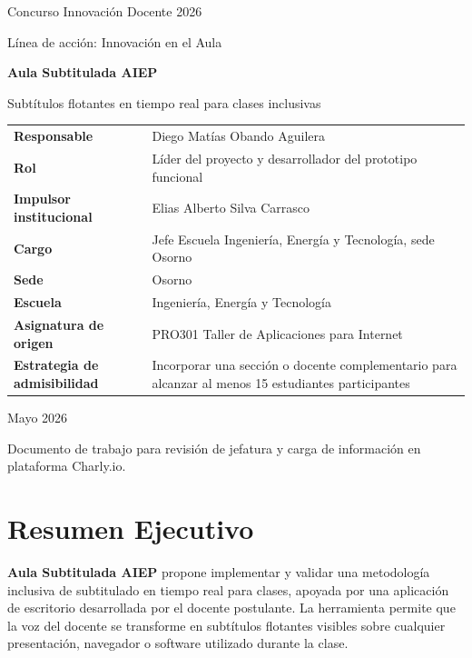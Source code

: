 \documentclass[11pt,letterpaper]{article}
\begin{document}
\begin{titlepage}
  \centering
  \vspace*{1.2cm}
  {\Large\textcolor{TextGray}{Concurso Innovación Docente 2026}\par}
  \vspace{0.3cm}
  {\large\textcolor{AiepBlue}{Línea de acción: Innovación en el Aula}\par}
  \vspace{1.8cm}
  {\Huge\bfseries\textcolor{AiepBlue}{Aula Subtitulada AIEP}\par}
  \vspace{0.35cm}
  {\Large\textcolor{TextGray}{Subtítulos flotantes en tiempo real para clases inclusivas}\par}
  \vspace{1.4cm}
  \begin{tabular}{>{\bfseries}p{5.4cm}p{8.2cm}}
    Responsable & Diego Matías Obando Aguilera \\
    Rol & Líder del proyecto y desarrollador del prototipo funcional \\
    Impulsor institucional & Elias Alberto Silva Carrasco \\
    Cargo & Jefe Escuela Ingeniería, Energía y Tecnología, sede Osorno \\
    Sede & Osorno \\
    Escuela & Ingeniería, Energía y Tecnología \\
    Asignatura de origen & PRO301 Taller de Aplicaciones para Internet \\
    Estrategia de admisibilidad & Incorporar una sección o docente complementario para alcanzar al menos 15 estudiantes participantes \\
  \end{tabular}
  \vfill
  {\large Mayo 2026\par}
  \vspace{0.3cm}
  {\small Documento de trabajo para revisión de jefatura y carga de información en plataforma Charly.io.}
\end{titlepage}

\tableofcontents
\newpage

\section{Resumen Ejecutivo}

\textbf{Aula Subtitulada AIEP} propone implementar y validar una metodología inclusiva de subtitulado en tiempo real para clases, apoyada por una aplicación de escritorio desarrollada por el docente postulante. La herramienta permite que la voz del docente se transforme en subtítulos flotantes visibles sobre cualquier presentación, navegador o software utilizado durante la clase.
\end{document}
